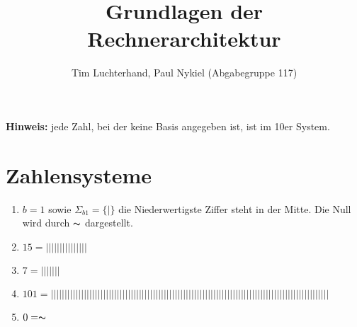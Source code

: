 \documentclass[DIN, pagenumber=false, fontsize=11pt, parskip=half]{scrartcl}
\title{Grundlagen der Rechnerarchitektur}
\author{Tim Luchterhand, Paul Nykiel (Abgabegruppe 117)}
\begin{document}
    \maketitle
    \textbf{Hinweis: } jede Zahl, bei der keine Basis angegeben ist, ist im 10er System.
    \section{Zahlensysteme}
    \begin{enumerate}
        \item  $b = 1$ sowie $\Sigma_{b1} = \{|\}$ die Niederwertigste Ziffer steht in der Mitte. Die Null wird durch $\thicksim$ dargestellt.
        \item $15 = ||||| ||||| |||||$
        \item $7 = || |||||$
        \item $101 = | 
            ||||| ||||| 
            ||||| ||||| 
            ||||| ||||| 
            ||||| ||||| 
            ||||| ||||| 
            ||||| ||||| 
            ||||| ||||| 
            ||||| ||||| 
            ||||| ||||| 
            ||||| |||||$
        \item $0 = \thicksim$

    \end{enumerate}
\end{document}
